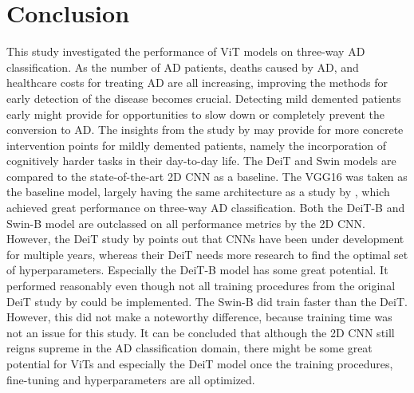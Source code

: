 \documentclass[11pt, a4paper]{article}
\begin{document}
\section{Conclusion}
This study investigated the performance of ViT models on three-way AD classification. As the number of AD patients, deaths caused by AD, and healthcare costs for treating AD are all increasing, improving the methods for early detection of the disease becomes crucial. Detecting mild demented patients early might provide for opportunities to slow down or completely prevent the conversion to AD. The insights from the study by \cite{Turknett2022DemandDementia} may provide for more concrete intervention points for mildly demented patients, namely the incorporation of cognitively harder tasks in their day-to-day life. The DeiT and Swin models are compared to the state-of-the-art 2D CNN as a baseline. The VGG16 was taken as the baseline model, largely having the same architecture as a study by \cite{Jain2019ConvolutionalImages}, which achieved great performance on three-way AD classification. Both the DeiT-B and Swin-B model are outclassed on all performance metrics by the 2D CNN. However, the DeiT study by \cite{Touvron2021TrainingAttention} points out that CNNs have been under development for multiple years, whereas their DeiT needs more research to find the optimal set of hyperparameters. Especially the DeiT-B model has some great potential. It performed reasonably even though not all training procedures from the original DeiT study by \cite{Touvron2021TrainingAttention} could be implemented. The Swin-B did train faster than the DeiT. However, this did not make a noteworthy difference, because training time was not an issue for this study. It can be concluded that although the 2D CNN still reigns supreme in the AD classification domain, there might be some great potential for ViTs and especially the DeiT model once the training procedures, fine-tuning and hyperparameters are all optimized.

\newpage


\end{document}
